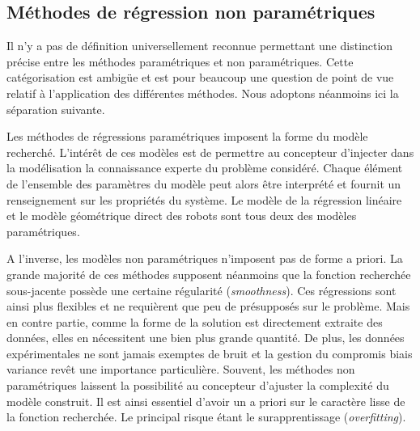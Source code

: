 \subsection{Méthodes de régression non paramétriques\label{sec:odometry_non_parametric}}

Il n'y a pas de définition universellement reconnue permettant une distinction 
précise entre les méthodes paramétriques et non paramétriques.
Cette catégorisation est ambigüe et est pour beaucoup une 
question de point de vue relatif à l'application des différentes méthodes.
Nous adoptons néanmoins ici la séparation suivante.

Les méthodes de régressions paramétriques imposent la forme du modèle recherché.
L'intérêt de ces modèles est de permettre au concepteur d'injecter
dans la modélisation la connaissance experte du problème considéré.
Chaque élément de l'ensemble des paramètres du modèle peut
alors être interprété et fournit un renseignement 
sur les propriétés du système.
Le modèle de la régression linéaire et le modèle géométrique direct
des robots sont tous deux des modèles paramétriques.

A l'inverse, les modèles non paramétriques n'imposent pas de forme a priori.
La grande majorité de ces méthodes supposent néanmoins que la fonction
recherchée sous-jacente possède une certaine régularité (\textit{smoothness}).
Ces régressions sont ainsi plus flexibles et ne requièrent que peu de 
présupposés sur le problème.
Mais en contre partie, comme la forme de la solution est directement extraite
des données, elles en nécessitent une bien plus grande quantité.
De plus, les données expérimentales ne sont jamais exemptes de bruit et
la gestion du compromis biais variance revêt une importance particulière.
Souvent, les méthodes non paramétriques laissent la possibilité au concepteur 
d'ajuster la complexité du modèle construit.
Il est ainsi essentiel d'avoir un a priori sur le caractère lisse 
de la fonction recherchée. 
Le principal risque étant le surapprentissage (\textit{overfitting}).\\


